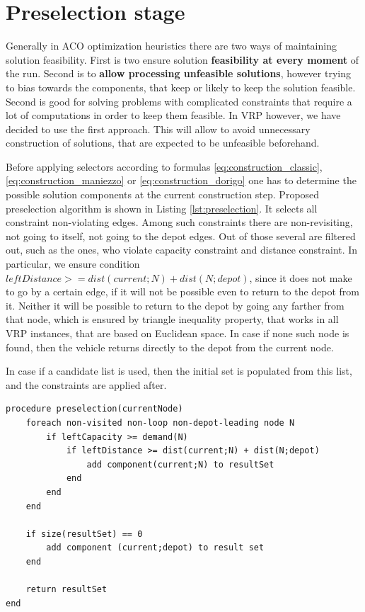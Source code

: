 \documentclass[11pt,a4paper,oneside]{book}
\begin{document}
\section{Preselection stage}

Generally in ACO optimization heuristics there are two ways of maintaining solution feasibility. First is two ensure solution \textbf{feasibility at every moment} of the run. Second is to \textbf{allow processing unfeasible solutions}, however trying to bias towards the components, that keep or likely to keep the solution feasible. Second is good for solving problems with complicated constraints that require a lot of computations in order to keep them feasible. In VRP however, we have decided to use the first approach. This will allow to avoid unnecessary construction of solutions, that are expected to be unfeasible beforehand. \par

Before applying selectors according to formulas \eqref{eq:construction_classic}, \eqref{eq:construction_maniezzo} or \eqref{eq:construction_dorigo} one has to determine the possible solution components at the current construction step. Proposed preselection algorithm is shown in Listing \ref{lst:preselection}. It selects all constraint non-violating edges. Among such constraints there are non-revisiting, not going to itself, not going to the depot edges. Out of those several are filtered out, such as the ones, who violate capacity constraint and distance constraint. In particular, we ensure condition $leftDistance >= dist(current;N) + dist(N;depot)$, since it does not make to go by a certain edge, if it will not be possible even to return to the depot from it. Neither it will be possible to return to the depot by going any farther from that node, which is ensured by triangle inequality property, that works in all VRP instances, that are based on Euclidean space. In case if none such node is found, then the vehicle returns directly to the depot from the current node.

In case if a candidate list is used, then the initial set is populated from this list, and the constraints are applied after.

\begin{minipage}[c, breaklines=true]{0.95\textwidth}
\begin{lstlisting}[caption={Solution component preselection pseudo-code}, label={lst:preselection}]
procedure preselection(currentNode)
	foreach non-visited non-loop non-depot-leading node N
		if leftCapacity >= demand(N)
			if leftDistance >= dist(current;N) + dist(N;depot)
				add component(current;N) to resultSet
			end
		end
	end
	
	if size(resultSet) == 0
		add component (current;depot) to result set
	end
		
	return resultSet
end
\end{lstlisting}
\end{minipage}
\end{document}
